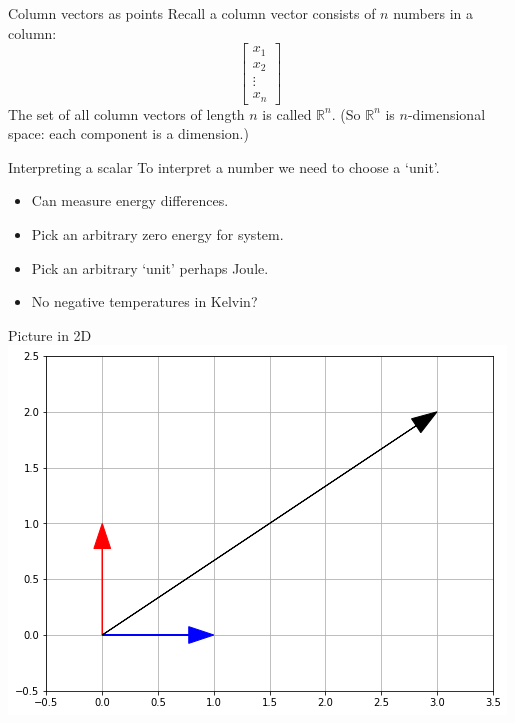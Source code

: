 \documentclass{beamer}
\begin{document}
\begin{frame}{Column vectors as points}
  Recall a column vector consists of $n$ numbers in a column:
  \begin{equation*}
    \left[
      \begin{array}{c}
        x_1\\
        x_2\\
        \vdots\\
        x_n
      \end{array}
    \right]
  \end{equation*}
  The set of all column vectors of length $n$ is called $\mathbb R^n$.\vfill
  (So $\mathbb R^n$ is $n$-dimensional space: each component is a dimension.)
\end{frame}

\begin{frame}{Interpreting a scalar}
  To interpret a number we need to choose a `unit'.
  \begin{example}[Energy]
    \begin{itemize}
    \item Can measure energy differences.
    \item Pick an arbitrary zero energy for system.
    \item Pick an arbitrary `unit' perhaps Joule.
    \end{itemize}
  \end{example}
  \begin{example}
    \begin{itemize}
    \item No negative temperatures in Kelvin?
    \end{itemize}
  \end{example}
\end{frame}

\begin{frame}{Picture in 2D}
  \includegraphics[scale=0.6]{2dvector.png}
\end{frame}
\end{document}
